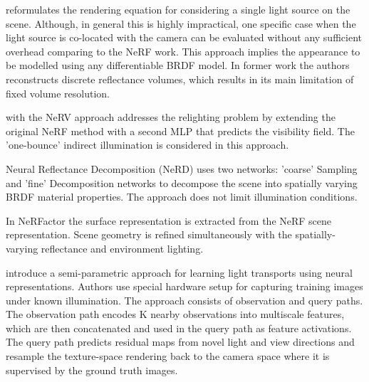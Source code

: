 \cite{bi2020neural} reformulates the rendering equation for considering a single light source on the scene.
Although, in general this is highly impractical, one specific case
when the light source is co-located with the camera can be evaluated
without any sufficient overhead comparing to the NeRF work.
This approach implies the appearance to be modelled using any differentiable BRDF model.
In former work \cite{bi2020deep} the authors reconstructs discrete reflectance volumes,
which results in its main limitation of fixed volume resolution.

\cite{nerv2021} with the NeRV approach addresses the relighting problem
by extending the original NeRF method with a second MLP
that predicts the visibility field.
The 'one-bounce' indirect illumination is considered in this approach.

Neural Reflectance Decomposition (NeRD) \cite{boss2020nerd} uses two networks:
'coarse' Sampling and 'fine' Decomposition networks to decompose the scene into
spatially varying BRDF material properties.
The approach does not limit illumination conditions.

In NeRFactor \cite{nerfactor} the surface representation is extracted from the NeRF scene representation.
Scene geometry is refined simultaneously with the spatially-varying reflectance and environment lighting.



\cite{Zhang2021lighttransport} introduce a semi-parametric approach
for learning light transports using neural representations.
Authors use special hardware setup for capturing training images under known illumination.
The approach consists of observation and query paths.
The observation path encodes K nearby observations into multiscale features,
which are then concatenated and used in the query path as feature activations.
The query path predicts residual maps from novel light and view directions
and resample the texture-space rendering back to the camera space
where it is supervised by the ground truth images.







